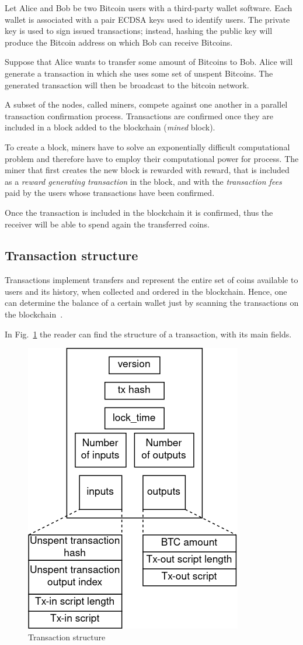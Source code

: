 \documentclass[12pt, letterpaper, twoside]{article}
\begin{document}
Let Alice and Bob be two Bitcoin users with a third-party wallet software. Each wallet is associated with a pair ECDSA keys used to identify users. The private key is used to sign issued transactions; instead, hashing the public key will produce the Bitcoin address on which Bob can receive Bitcoins. 

Suppose that Alice wants to transfer some amount of Bitcoins to Bob. Alice will generate a transaction in which she uses some set of unspent Bitcoins. The generated transaction will then be broadcast to the bitcoin network.

A subset of the nodes, called miners, compete against one another in a parallel transaction confirmation process. Transactions are confirmed once they are included in a block added to the blockchain (\emph{mined} block).

To create a block, miners have to solve an exponentially difficult computational problem and therefore have to employ their computational power for process. The miner that first creates the new block is rewarded with reward, that is included as a \emph{reward generating transaction} in the block, and with the \emph{transaction fees} paid by the users whose transactions have been confirmed.

Once the transaction is included in the blockchain it is confirmed, thus the receiver will be able to spend again the transferred coins.

\subsection{Transaction structure}\label{sec:tx}
Transactions implement transfers and represent the entire set of coins available to users and its history, when collected and ordered in the blockchain. Hence, one can determine the balance of a certain wallet just by scanning the transactions on the blockchain~\cite{tschorsch-intro-survey}.

In Fig.~\ref{fig:tx} the reader can find the structure of a transaction, with its main fields.

\begin{figure}[h]
	\includegraphics[width=.40\textwidth]{pict/txstruct.png}
	\centering
	\caption{Transaction structure}
	\label{fig:tx}
\end{figure}
\end{document}
